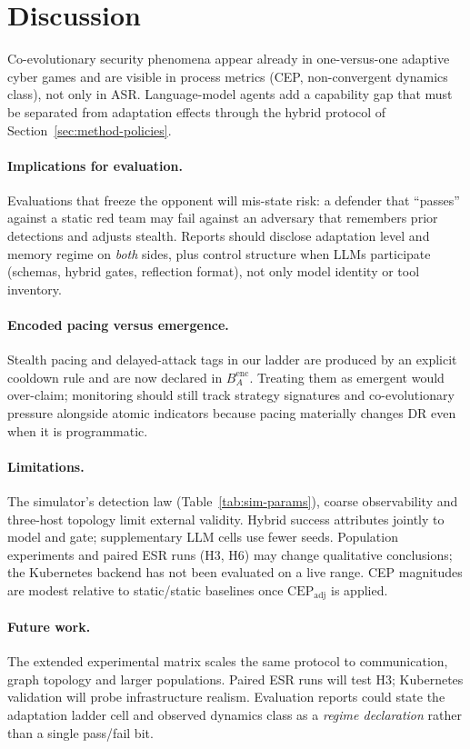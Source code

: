 \section{Discussion}
\label{sec:discussion}

Co-evolutionary security phenomena appear already in one-versus-one adaptive
cyber games and are visible in process metrics (CEP, non-convergent dynamics
class), not only in ASR. Language-model agents add a capability gap that must
be separated from adaptation effects through the hybrid protocol of
Section~\ref{sec:method-policies}.

\paragraph{Implications for evaluation.}
Evaluations that freeze the opponent will mis-state risk: a defender that
``passes'' against a static red team may fail against an adversary that
remembers prior detections and adjusts stealth. Reports should disclose
adaptation level and memory regime on \emph{both} sides, plus control
structure when LLMs participate (schemas, hybrid gates, reflection format),
not only model identity or tool inventory.

\paragraph{Encoded pacing versus emergence.}
Stealth pacing and delayed-attack tags in our ladder are produced by an
explicit cooldown rule and are now declared in $B_A^{\mathrm{enc}}$. Treating
them as emergent would over-claim; monitoring should still track strategy
signatures and co-evolutionary pressure alongside atomic indicators because
pacing materially changes DR even when it is programmatic.

\paragraph{Limitations.}
The simulator's detection law (Table~\ref{tab:sim-params}), coarse
observability and three-host topology limit external validity. Hybrid success
attributes jointly to model and gate; supplementary LLM cells use fewer seeds.
Population experiments and paired ESR runs (H3, H6) may change qualitative
conclusions; the Kubernetes backend has not been evaluated on a live range.
CEP magnitudes are modest relative to static/static baselines once
$\mathrm{CEP}_{\mathrm{adj}}$ is applied.

\paragraph{Future work.}
The extended experimental matrix scales the same protocol to communication,
graph topology and larger populations. Paired ESR runs will test H3;
Kubernetes validation will probe infrastructure realism. Evaluation reports
could state the adaptation ladder cell and observed dynamics class as a
\emph{regime declaration} rather than a single pass/fail bit.
